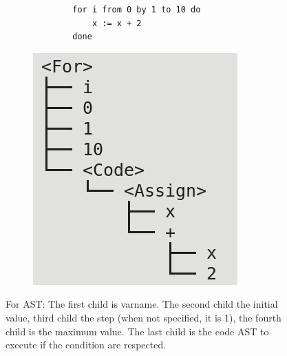 \documentclass[letterpaper]{article}
\begin{document}
\begin{figure}[H]
    \begin{subfigure}{.5\textwidth}
        \begin{lstlisting}
        for i from 0 by 1 to 10 do
            x := x + 2
        done
    \end{lstlisting}
    \end{subfigure}
    \begin{subfigure}{.5\textwidth}
    \includegraphics[scale=0.5]{image/for.png}
\end{subfigure}
    \caption{For AST: The first child is varname. The second child the
    initial value, third child the step (when not specified, it is 1),
    the fourth child is the maximum value. The last child is the code
    AST to execute if the condition are respected.}
\end{figure}
\end{document}
